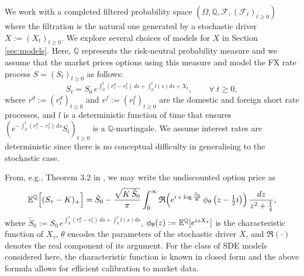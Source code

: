\documentclass[onefignum,onetabnum]{siamonline190516}
\begin{document}
We work with a completed filtered probability space  $(\Omega,\mathbb{Q},\mathcal{F},(\mathcal{F}_t)_{t\geq0})$ where the filtration is the natural one generated by a stochastic driver $X:=(X_t)_{t\geq0}$. We explore several choices of models for $X$ in Section \ref{sec:models}. Here, $\mathbb{Q}$ represents the risk-neutral probability measure and we assume that the market prices options using this measure and model the FX rate process $S=(S_t)_{t\ge0}$  as follows:
\begin{equation}
    S_t = S_0\, e^{\int_0^t (r^d_s - r^f_s)\,ds + \int_0^{t} l(s)ds + X_t }, \qquad \forall \; t\ge0,
\end{equation}
where $r^d:=(r^d_t)_{t\ge0}$ and $r^f:=(r^f_t)_{t\ge0}$ are the domestic and foreign short rate processes, and $l$ is a deterministic function of time that ensures $(e^{-\int_0^t (r^d_s - r^f_s)\,ds } S_t)_{t\ge0}$ is a $\mathbb{Q}$-martingale. We assume interest rates are  deterministic since there is no conceptual difficulty in generalising to the stochastic case.

From, e.g., Theorem 3.2 in \cite{lewis2001simple}, we may write the undiscounted option price as
\begin{equation}
{{\mathbb{E}}^{\mathbb{Q}}} \Big[ (S_\tau - K )_+\Big]
    =
    \tilde{S}_0 - \frac{\sqrt{K \,\tilde{S}_0}}{\pi} \int_{0}^{\infty} \mathfrak{R}\!\left( e^{i\,z\,\log \frac{\tilde{S}_0}{K}}
    \,\phi_\theta\left(z - \tfrac{1}{2}i\right)\right) \frac{dz}{z^2 + \frac{1}{4}},
    \label{eqn:FourierTransformPrice}
\end{equation}
where $\tilde{S}_0:=S_0\, e^{\int_0^\tau (r^d_s - r^f_s)\,ds + \int_0^{\tau} l(s)ds}$, $\phi_\theta(z):={{\mathbb{E}}^{\mathbb{Q}}}[e^{izX_\tau}]$ is the  characteristic function of $X_\tau$, $\theta$ encodes the parameters of the stochastic driver $X$, and $\mathfrak{R}(\cdot)$ denotes the real component of its argument. For the class of SDE models considered here, the characteristic function is known in closed form and the above formula allows for efficient calibration to market data.
\end{document}
